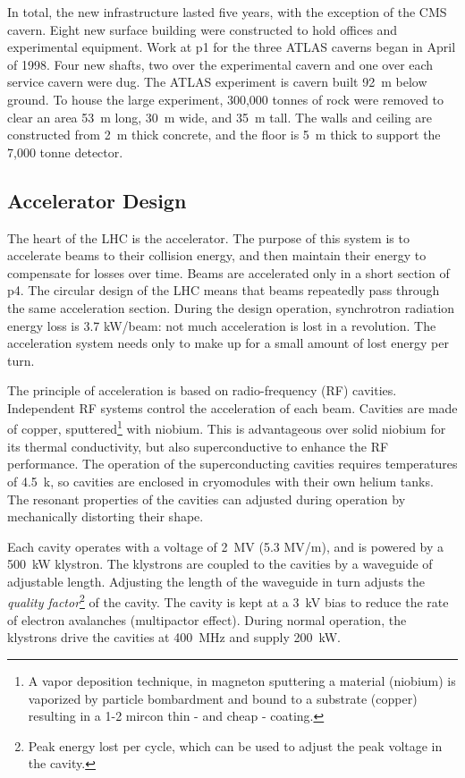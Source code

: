 In total, the new infrastructure lasted five years, with the exception of the CMS cavern.
Eight new surface building were constructed to hold offices and experimental equipment. 
Work at p1 for the three ATLAS caverns began in April of 1998.\cite{lhcDesignV2}
Four new shafts, two over the experimental cavern and one over each service cavern were dug.
The ATLAS experiment is cavern built 92~m below ground. 
To house the large experiment, 300,000 tonnes of rock were removed to clear an area 53~m long, 30~m wide, and 35~m tall.
The walls and ceiling are constructed from 2~m thick concrete, and the floor is 5~m thick to support the 7,000 tonne detector. \cite{atlasFacts}


\subsection{Accelerator Design}
The heart of the LHC is the accelerator.
The purpose of this system is to accelerate beams to their collision energy, and then maintain their energy to compensate for losses over time.
Beams are accelerated only in a short section of p4.
The circular design of the LHC means that beams repeatedly pass through the same acceleration section.
During the design operation, synchrotron radiation energy loss is 3.7 kW/beam: not much acceleration is lost in a revolution.
The acceleration system needs only to make up for a small amount of lost energy per turn.

The principle of acceleration is based on radio-frequency (RF) cavities.
Independent RF systems control the acceleration of each beam.
Cavities are made of copper, sputtered\footnote{A vapor deposition technique, in magneton sputtering a material (niobium) is vaporized by particle bombardment and bound to a substrate (copper) resulting in a 1-2 mircon thin - and cheap - coating.} with niobium.
This is advantageous over solid niobium for its thermal conductivity, but also superconductive to enhance the RF performance.\cite{lyndon}
The operation of the superconducting cavities requires temperatures of 4.5~k, so cavities are enclosed in cryomodules with their own helium tanks. \cite{boussard}
The resonant properties of the cavities can adjusted during operation by mechanically distorting their shape.

Each cavity operates with a voltage of 2~MV (5.3 MV/m), and is powered by a 500~kW klystron.
The klystrons are coupled to the cavities by a waveguide of adjustable length.
Adjusting the length of the waveguide in turn adjusts the \emph{quality factor}\footnote{Peak energy lost per cycle, which can be used to adjust the peak voltage in the cavity.} of the cavity.
The cavity is kept at a 3~kV bias to reduce the rate of electron avalanches (multipactor effect).
During normal operation, the klystrons drive the cavities at 400~MHz and supply 200~kW.

